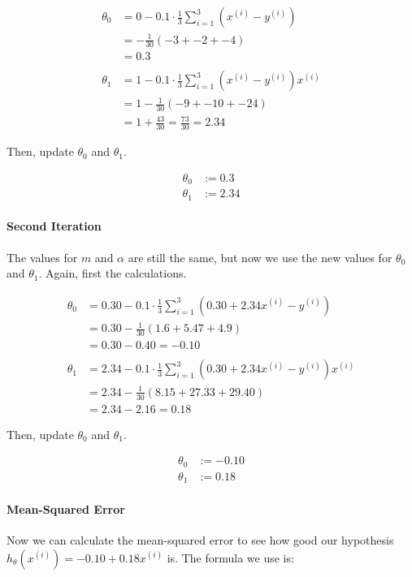 \documentclass[12pt, a4paper]{article}
\begin{document}
		\begin{align*}
		\theta_0 &= 0 - 0.1 \cdot \frac{1}{3}\sum\limits_{i=1}^3 (x ^{(i)} - y ^{(i)})\\
		&= -\frac{1}{30} (-3 + -2 + -4)\\
		&= 0.3 \\
		\\
		\theta_1&=1-0.1 \cdot \frac{1}{3}\sum\limits_{i=1}^3 (x ^{(i)} - y ^{(i)})x^{(i)}\\
		&=1-\frac{1}{30}(-9+-10+-24)\\
		&=1+\frac{43}{30}=\frac{73}{30}=2.34
		\end{align*}
		
		Then, update $\theta_0$ and $\theta_1$.
		
		\begin{align*}
		\theta_0 &:= 0.3 \\
		\theta_1&:=2.34
		\end{align*}
	
	\paragraph{Second Iteration}
	The values for $m$ and $\alpha$ are still the same, but now we use the new values for $\theta_0$ and $\theta_1$. Again, first the calculations.
	
		\begin{align*}
		\theta_0 &= 0.30 - 0.1 \cdot \frac{1}{3}\sum\limits_{i=1}^3 (0.30+2.34x ^{(i)} - y ^{(i)})\\
		&= 0.30-\frac{1}{30} (1.6+5.47+4.9)\\
		&= 0.30 - 0.40 = -0.10\\
		\\
		\theta_1&=2.34-0.1 \cdot \frac{1}{3}\sum\limits_{i=1}^3 (0.30+2.34x ^{(i)} - y ^{(i)})x^{(i)}\\
		&=2.34-\frac{1}{30}(8.15+27.33+29.40)\\
		&=2.34-2.16=0.18
		\end{align*}
		
		\pagebreak
		Then, update $\theta_0$ and $\theta_1$.
		
		\begin{align*}
		\theta_0 &:= -0.10\\
		\theta_1&:=0.18
		\end{align*}
	
	\paragraph{Mean-Squared Error}
	Now we can calculate the mean-squared error to see how good our hypothesis $h_\theta(x^{(i)}) = -0.10 + 0.18x^{(i)}$ is. The formula we use is:
	
\end{document}
